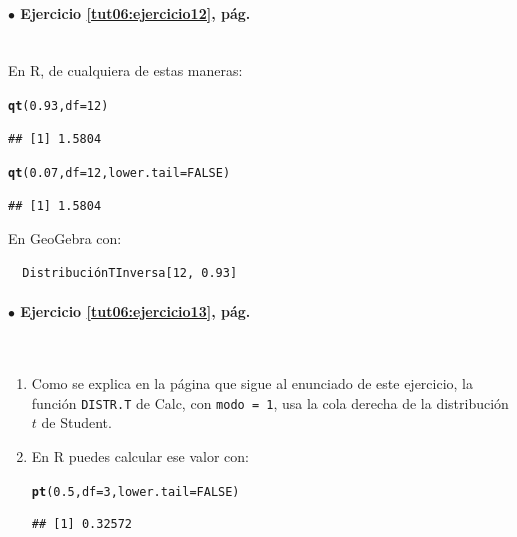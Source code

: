 \documentclass[10pt,a4paper]{article}\usepackage[]{graphicx}\usepackage[]{color}
\makeatletter
\newcommand{\hlnum}[1]{\textcolor[rgb]{0.686,0.059,0.569}{#1}}%
\newcommand{\hlstd}[1]{\textcolor[rgb]{0.345,0.345,0.345}{#1}}%
\newcommand{\hlkwc}[1]{\textcolor[rgb]{0.333,0.667,0.333}{#1}}%
\newcommand{\hlkwd}[1]{\textcolor[rgb]{0.737,0.353,0.396}{\textbf{#1}}}%
\newenvironment{kframe}{%
 \def\at@end@of@kframe{}%
 \ifinner\ifhmode%
  \def\at@end@of@kframe{\end{minipage}}%
  \begin{minipage}{\columnwidth}%
 \fi\fi%
 \def\FrameCommand##1{\hskip\@totalleftmargin \hskip-\fboxsep
 \colorbox{shadecolor}{##1}\hskip-\fboxsep
     \hskip-\linewidth \hskip-\@totalleftmargin \hskip\columnwidth}%
 \MakeFramed {\advance\hsize-\width
   \@totalleftmargin\z@ \linewidth\hsize
   \@setminipage}}%
 {\par\unskip\endMakeFramed%
 \at@end@of@kframe}
\newenvironment{knitrout}{}{} %
\makeatother
\begin{document}
\paragraph{\bf $\bullet$ Ejercicio \ref{tut06:ejercicio12}, pág. \pageref{tut06:ejercicio12}}
\label{tut06:ejercicio12:sol}\quad\\

En R, de cualquiera de estas maneras:
\begin{knitrout}
\color{fgcolor}\begin{kframe}
\begin{alltt}
\hlkwd{qt}\hlstd{(}\hlnum{0.93}\hlstd{,} \hlkwc{df}\hlstd{=}\hlnum{12}\hlstd{)}
\end{alltt}
\begin{verbatim}
## [1] 1.5804
\end{verbatim}
\begin{alltt}
\hlkwd{qt}\hlstd{(}\hlnum{0.07}\hlstd{,} \hlkwc{df}\hlstd{=}\hlnum{12}\hlstd{,} \hlkwc{lower.tail}\hlstd{=}\hlnum{FALSE}\hlstd{)}
\end{alltt}
\begin{verbatim}
## [1] 1.5804
\end{verbatim}
\end{kframe}
\end{knitrout}
En GeoGebra con:
\begin{verbatim}
  DistribuciónTInversa[12, 0.93]
\end{verbatim}


\paragraph{\bf $\bullet$ Ejercicio \ref{tut06:ejercicio13}, pág. \pageref{tut06:ejercicio13}}
\label{tut06:ejercicio13:sol}\quad\\

\begin{enumerate}
  \item Como se explica en la página que sigue al enunciado de este ejercicio, la función {\tt DISTR.T} de Calc, con {\tt modo = 1}, usa la cola derecha de la distribución $t$ de Student.
  \item En R puedes calcular ese valor con:
\begin{knitrout}
\color{fgcolor}\begin{kframe}
\begin{alltt}
\hlkwd{pt}\hlstd{(}\hlnum{0.5}\hlstd{,} \hlkwc{df}\hlstd{=}\hlnum{3}\hlstd{,} \hlkwc{lower.tail}\hlstd{=}\hlnum{FALSE}\hlstd{)}
\end{alltt}
\begin{verbatim}
## [1] 0.32572
\end{verbatim}
\end{kframe}
\end{knitrout}

\end{enumerate}
\end{document}

